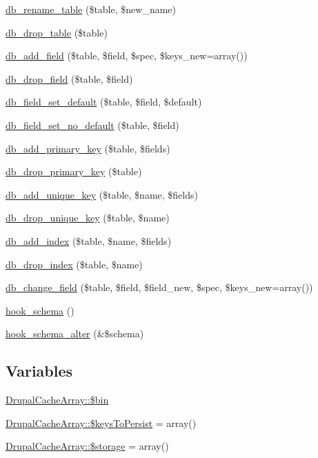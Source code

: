 \begin{DoxyCompactItemize}
\item 
\hyperlink{group__schemaapi_ga629fe4d738f4caeb9d8c8acc2cc4d05b}{db\_\-rename\_\-table} (\$table, \$new\_\-name)
\item 
\hyperlink{group__schemaapi_ga5d744ae7a6fe2c9eaa1c7bd350a071d3}{db\_\-drop\_\-table} (\$table)
\item 
\hyperlink{group__schemaapi_ga10bc9c435dd6d36c112d7ec179840cff}{db\_\-add\_\-field} (\$table, \$field, \$spec, \$keys\_\-new=array())
\item 
\hyperlink{group__schemaapi_ga0e404d9200bf56fbed738aa4f57b3ec4}{db\_\-drop\_\-field} (\$table, \$field)
\item 
\hyperlink{group__schemaapi_ga63a499297d184dba68309dcd1b7e17d4}{db\_\-field\_\-set\_\-default} (\$table, \$field, \$default)
\item 
\hyperlink{group__schemaapi_gad1714b6920155f673f4291845fdb5f62}{db\_\-field\_\-set\_\-no\_\-default} (\$table, \$field)
\item 
\hyperlink{group__schemaapi_ga666b117ebedc9b50dacf193c6ba4dcf8}{db\_\-add\_\-primary\_\-key} (\$table, \$fields)
\item 
\hyperlink{group__schemaapi_ga733a41de3d8b74798a8cf3c87ae33715}{db\_\-drop\_\-primary\_\-key} (\$table)
\item 
\hyperlink{group__schemaapi_gad6dd1c6f39d180bc21853ac6118a8f40}{db\_\-add\_\-unique\_\-key} (\$table, \$name, \$fields)
\item 
\hyperlink{group__schemaapi_gab06ca0fe63625f37a649cf3432fd8ffe}{db\_\-drop\_\-unique\_\-key} (\$table, \$name)
\item 
\hyperlink{group__schemaapi_gafb7153a65df9b5a0877a602cde86a0cc}{db\_\-add\_\-index} (\$table, \$name, \$fields)
\item 
\hyperlink{group__schemaapi_gaa59d447eb4a7b25350fb7404f9a70ec0}{db\_\-drop\_\-index} (\$table, \$name)
\item 
\hyperlink{group__schemaapi_ga9e0a4211eb8137e187d5f3f4fa716cea}{db\_\-change\_\-field} (\$table, \$field, \$field\_\-new, \$spec, \$keys\_\-new=array())
\item 
\hyperlink{group__schemaapi_ga9abd926ddaf68a22e6dca28a25d0c6f5}{hook\_\-schema} ()
\item 
\hyperlink{group__schemaapi_ga4a00aaeabd6903f707d8385476b9ae2a}{hook\_\-schema\_\-alter} (\&\$schema)
\end{DoxyCompactItemize}
\subsection*{Variables}
\begin{DoxyCompactItemize}
\item 
\hyperlink{group__schemaapi_ga29eeef3160c70f129c447e796e330cdb}{DrupalCacheArray::\$bin}
\item 
\hyperlink{group__schemaapi_ga0ba2e712f18ec2c8ee8bf97d115c85d1}{DrupalCacheArray::\$keysToPersist} = array()
\item 
\hyperlink{group__schemaapi_ga696fd96aa3639a9d7d968961db9d5819}{DrupalCacheArray::\$storage} = array()
\end{DoxyCompactItemize}
